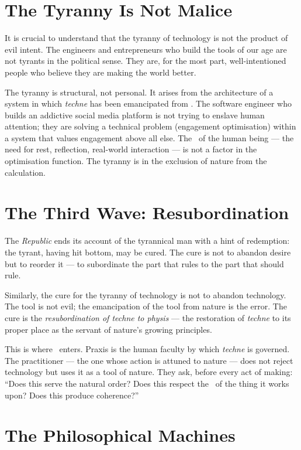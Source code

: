 \section{The Tyranny Is Not Malice}

It is crucial to understand that the tyranny of technology is not the product
of evil intent. The engineers and entrepreneurs who build the tools of our age
are not tyrants in the political sense. They are, for the most part, well-intentioned
people who believe they are making the world better.

The tyranny is structural, not personal. It arises from the architecture of a
system in which \emph{techne} has been emancipated from \physis. The software
engineer who builds an addictive social media platform is not trying to enslave
human attention; they are solving a technical problem (engagement optimisation)
within a system that values engagement above all else. The \physis\ of the
human being --- the need for rest, reflection, real-world interaction --- is not
a factor in the optimisation function. The tyranny is in the exclusion of nature
from the calculation.

\section{The Third Wave: Resubordination}

The \emph{Republic} ends its account of the tyrannical man with a hint of
redemption: the tyrant, having hit bottom, may be cured. The cure is not to
abandon desire but to reorder it --- to subordinate the part that rules to the
part that should rule.

Similarly, the cure for the tyranny of technology is not to abandon technology.
The tool is not evil; the emancipation of the tool from nature is the error. The
cure is the \emph{resubordination of techne to physis} --- the restoration of
\emph{techne} to its proper place as the servant of nature's growing principles.

This is where \praxis\ enters. Praxis is the human faculty by which \emph{techne}
is governed. The practitioner --- the one whose action is attuned to nature ---
does not reject technology but uses it as a tool of nature. They ask, before
every act of making: ``Does this serve the natural order? Does this respect the
\physis\ of the thing it works upon? Does this produce coherence?''

\section{The Philosophical Machines}

